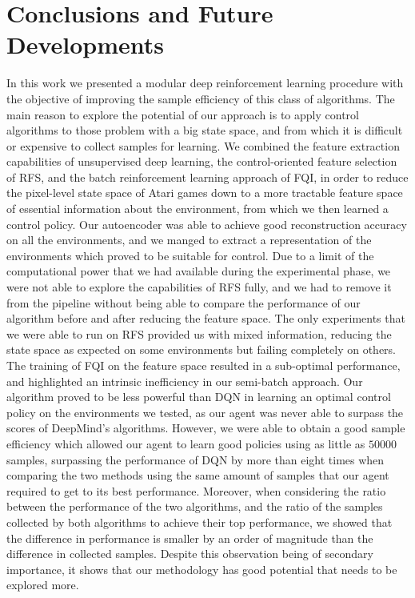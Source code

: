 \chapter{Conclusions and Future Developments}
\label{chapter7_conclusions}
\thispagestyle{empty}

\vspace{0.5cm}

In this work we presented a modular deep reinforcement learning procedure 
with the objective of improving the sample efficiency of this class of 
algorithms.
The main reason to explore the potential of our approach is to apply control
algorithms to those problem with a big state space, and from which it is 
difficult or expensive to collect samples for learning. 
We combined the feature extraction capabilities of unsupervised deep learning, 
the control-oriented feature selection of RFS, and the batch reinforcement 
learning approach of FQI, in order to reduce the pixel-level state
space of Atari games down to a more tractable feature space of essential 
information about the environment, from which we then learned a control policy.
Our autoencoder was able to achieve good reconstruction accuracy on all the
environments, and we manged to extract a representation of the environments 
which proved to be suitable for control.
Due to a limit of the computational power that we had available during the 
experimental phase, we were not able to explore the capabilities of RFS fully, 
and we had to remove it from the pipeline without being able to compare the 
performance of our algorithm before and after reducing the feature space. 
The only experiments that we were able to run on RFS provided us with mixed
information, reducing the state space as expected on some environments but 
failing completely on others. 
The training of FQI on the feature space resulted in a sub-optimal
performance, and highlighted an intrinsic inefficiency in our semi-batch 
approach.
Our algorithm proved to be less powerful than DQN in learning an optimal control
policy on the environments we tested, as our agent was never able to surpass the
scores of DeepMind's algorithms.
However, we were able to obtain a good sample efficiency which allowed our agent 
to learn good policies using as little as $50000$ samples, surpassing the 
performance of DQN by more than eight times when comparing the two methods 
using the same amount of samples that our agent required to get to its best
performance.
Moreover, when considering the ratio between the performance of the two 
algorithms, and the ratio of the samples collected by both algorithms to 
achieve their top performance, we showed that the difference in performance 
is smaller by an order of magnitude than the difference in collected samples. 
Despite this observation being of secondary importance, it shows that our 
methodology has good potential that needs to be explored more. 

